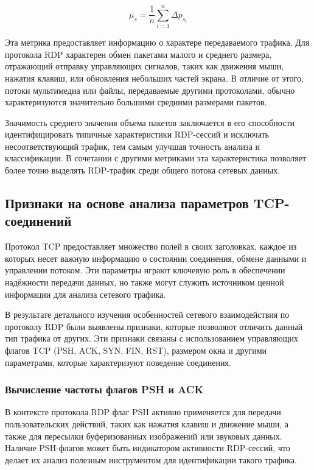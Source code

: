 \documentclass[bachelor, och, coursework]{SCWorks}
\begin{document}
\begin{equation}
  \mu_s = \frac{1}{n} \sum_{i=1}^{n} \Delta p_{s_i}
\end{equation}

Эта метрика предоставляет информацию о характере передаваемого трафика. Для протокола RDP характерен обмен пакетами малого и среднего 
размера, отражающий отправку управляющих сигналов, таких как движения мыши, нажатия клавиш, или обновления небольших частей экрана. В 
отличие от этого, потоки мультимедиа или файлы, передаваемые другими протоколами, обычно характеризуются значительно большими средними 
размерами пакетов.

Значимость среднего значения объема пакетов заключается в его способности идентифицировать типичные характеристики RDP-сессий и исключать 
несоответствующий трафик, тем самым улучшая точность анализа и классификации. В сочетании с другими метриками эта характеристика позволяет 
более точно выделять RDP-трафик среди общего потока сетевых данных.

\subsection{Признаки на основе анализа параметров TCP-соединений}

Протокол TCP предоставляет множество полей в своих заголовках, каждое из которых несет важную информацию о состоянии соединения, обмене данными и 
управлении потоком. Эти параметры играют ключевую роль в обеспечении надёжности передачи данных, но также могут служить источником ценной информации 
для анализа сетевого трафика.

В результате детального изучения особенностей сетевого взаимодействия по протоколу RDP были выявлены признаки, которые позволяют отличить данный 
тип трафика от других. Эти признаки связаны с использованием управляющих флагов TCP (PSH, ACK, SYN, FIN, RST), размером окна и другими параметрами, 
которые характеризуют поведение соединения.


\subsubsection{Вычисление частоты флагов PSH и ACK}

В контексте протокола RDP флаг PSH активно применяется для передачи пользовательских действий, таких как нажатия клавиш и движение мыши, 
а также для пересылки буферизованных изображений или звуковых данных. Наличие PSH-флагов может быть индикатором активности RDP-сессий, 
что делает их анализ полезным инструментом для идентификации такого трафика.
\end{document}
